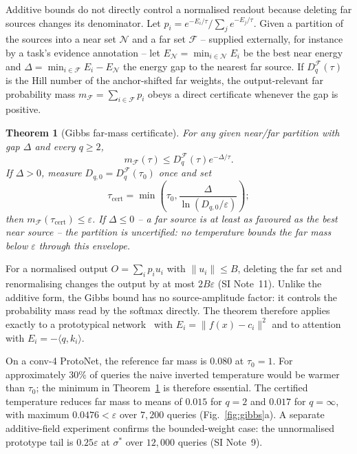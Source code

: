 \documentclass[10pt,twocolumn]{article}
\newtheorem{theorem}{Theorem}
\newcommand{\sstar}{\sigma^{*}}
\begin{document}
Additive bounds do not directly control a normalised readout because deleting far sources changes its denominator. Let $p_i=e^{-E_i/\tau}/\sum_j e^{-E_j/\tau}$. Given a partition of the sources into a near set $\mathcal{N}$ and a far set $\mathcal{F}$ -- supplied externally, for instance by a task's evidence annotation -- let $E_\mathcal{N}=\min_{i\in\mathcal{N}}E_i$ be the best near energy and $\Delta=\min_{i\in\mathcal{F}}E_i-E_\mathcal{N}$ the energy gap to the nearest far source. If $D_q^{\mathcal{F}}(\tau)$ is the Hill number of the anchor-shifted far weights, the output-relevant far probability mass $m_{\mathcal{F}}=\sum_{i\in\mathcal{F}}p_i$ obeys a direct certificate whenever the gap is positive.

\begin{theorem}[Gibbs far-mass certificate]\label{thm:gibbs}
For any given near/far partition with gap $\Delta$ and every $q\ge2$,
\begin{equation}
m_{\mathcal{F}}(\tau)\le D_q^{\mathcal{F}}(\tau)e^{-\Delta/\tau}.
\end{equation}
If $\Delta>0$, measure $D_{q,0}=D_q^{\mathcal{F}}(\tau_0)$ once and set
\begin{equation}
\tau_{\mathrm{cert}}=\min\!\left(\tau_0,\frac{\Delta}{\ln(D_{q,0}/\varepsilon)}\right);
\end{equation}
then $m_{\mathcal{F}}(\tau_{\mathrm{cert}})\le\varepsilon$. If $\Delta\le0$ -- a far source is at least as favoured as the best near source -- the partition is uncertified: no temperature bounds the far mass below $\varepsilon$ through this envelope.
\end{theorem}

For a normalised output $O=\sum_i p_i u_i$ with $\lVert u_i\rVert\le B$, deleting the far set and renormalising changes the output by at most $2B\varepsilon$ (SI Note~11). Unlike the additive form, the Gibbs bound has no source-amplitude factor: it controls the probability mass read by the softmax directly. The theorem therefore applies exactly to a prototypical network~\cite{snell2017} with $E_i=\lVert f(x)-c_i\rVert^2$ and to attention with $E_i=-\langle q,k_i\rangle$.

On a conv-4 ProtoNet, the reference far mass is $0.080$ at $\tau_0=1$. For approximately $30\%$ of queries the naive inverted temperature would be warmer than $\tau_0$; the minimum in Theorem~\ref{thm:gibbs} is therefore essential. The certified temperature reduces far mass to means of $0.015$ for $q=2$ and $0.017$ for $q=\infty$, with maximum $0.0476<\varepsilon$ over $7{,}200$ queries (Fig.~\ref{fig:gibbs}a). A separate additive-field experiment confirms the bounded-weight case: the unnormalised prototype tail is $0.25\varepsilon$ at $\sstar$ over $12{,}000$ queries (SI Note~9).
\end{document}
